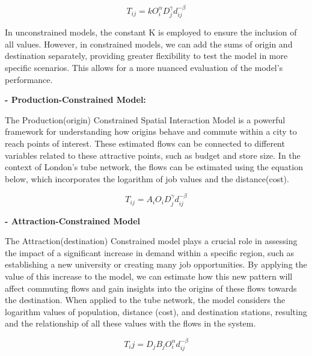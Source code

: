\documentclass[10pt]{report}
\numberwithin{figure}{section}
\numberwithin{table}{section}
\begin{document}
\begin{equation} \tag{1}
T_{ij} = k O_i^\alpha  D_j^\gamma  d_{ij}^{-\beta}
\end{equation}

\vspace{5mm} %

In unconstrained models, the constant K is employed to ensure the inclusion of all values. However, in constrained models, we can add the sums of origin and destination separately, providing greater flexibility to test the model in more specific scenarios. This allows for a more nuanced evaluation of the model's performance.

\vspace{5mm} %

\textbf{- Production-Constrained Model:}

The Production(origin) Constrained Spatial Interaction Model is a powerful framework for understanding how origins behave and commute within a city to reach points of interest. These estimated flows can be connected to different variables related to these attractive points, such as budget and store size. In the context of London's tube network, the flows can be estimated using the equation below, which incorporates the logarithm of job values and the distance(cost)\cite{pooler_extended_1994}.

\begin{equation} \label{eq:1} \tag{2}
T_{ij} = A_i O_i D_j^\gamma d_{ij}^{-\beta}
\end{equation}

\vspace{5mm} %

\textbf{- Attraction-Constrained Model}

The Attraction(destination) Constrained model plays a crucial role in assessing the impact of a significant increase in demand within a specific region, such as establishing a new university or creating many job opportunities. By applying the value of this increase to the model, we can estimate how this new pattern will affect commuting flows and gain insights into the origins of these flows towards the destination. When applied to the tube network, the model considers the logarithm values of population, distance (cost), and destination stations,  resulting and the relationship of all these values with the flows in the system\cite{pooler_extended_1994}.


\begin{equation} \label{eq:5} \tag{3}
T_ij = D_j B_j O_i^\alpha d_{ij}^{-\beta}
\end{equation}
\end{document}
